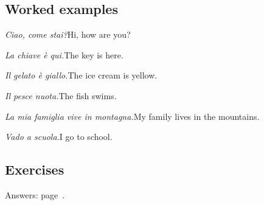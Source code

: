 \documentclass[11pt,a4paper,twoside,openright]{book}
\begin{document}
\subsection*{Worked examples}
\begin{examples}
\item\relax \textit{Ciao, come stai?}\newline Hi, how are you?
\item\relax \textit{La chiave è qui.}\newline The key is here.
\item\relax \textit{Il gelato è giallo.}\newline The ice cream is yellow.
\item\relax \textit{Il pesce nuota.}\newline The fish swims.
\item\relax \textit{La mia famiglia vive in montagna.}\newline My family lives in the mountains.
\item\relax \textit{Vado a scuola.}\newline I go to school.
\end{examples}

\subsection*{Exercises}\label{les:c-and-g:exercises}
{\color{muted}\small Answers: page~\pageref{ans:c-and-g}.}
\end{document}
